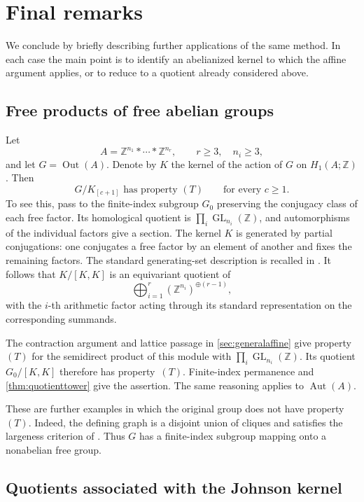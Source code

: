 \documentclass[11pt,a4paper]{article}
\theoremstyle{definition}
\newcommand{\Z}{\mathbb Z}
\newcommand{\GL}{\operatorname{GL}}
\newcommand{\Aut}{\operatorname{Aut}}
\newcommand{\rt}{(T)}
\begin{document}
\section{Final remarks}
\label{sec:finalremarks}

We conclude by briefly describing further applications of the same method.
In each case the main point is to identify an abelianized kernel
to which the affine argument applies, or to reduce to a quotient
already considered above.

\subsection{Free products of free abelian groups}

Let
\[
 A=\Z^{n_1}*\cdots *\Z^{n_r},\qquad r\ge3,\quad n_i\ge3,
\]
and let \(G=\operatorname{Out}(A)\). Denote by \(K\) the kernel
of the action of \(G\) on \(H_1(A;\Z)\). Then
\[
 G/K_{[c+1]}\text{ has property }\rt
 \qquad\text{for every }c\ge1.
\]
To see this, pass to the finite-index subgroup \(G_0\) preserving
the conjugacy class of each free factor. Its homological quotient
is \(\prod_i\GL_{n_i}(\Z)\), and automorphisms of the individual
factors give a section. The kernel \(K\) is generated by partial
conjugations: one conjugates a free factor by an element of another
and fixes the remaining factors. The standard generating-set
description is recalled in \cite[Section~2.5]{SaleRAAG}.
It follows that \(K/[K,K]\) is an equivariant quotient of
\[
 \bigoplus_{i=1}^r(\Z^{n_i})^{\oplus(r-1)},
\]
with the \(i\)-th arithmetic factor acting through its standard
representation on the corresponding summands.

The contraction argument and lattice passage in
\cref{sec:generalaffine} give property~\(\rt\) for the semidirect
product of this module with \(\prod_i\GL_{n_i}(\Z)\).
Its quotient \(G_0/[K,K]\) therefore has property~\(\rt\).
Finite-index permanence and \cref{thm:quotienttower} give the
assertion. The same reasoning applies to \(\Aut(A)\).

These are further examples in which the original group does not
have property~\(\rt\). Indeed, the defining graph is a disjoint
union of cliques and satisfies the largeness criterion of
\cite[Theorem~2(1b)]{GuirardelSale}. Thus \(G\) has a finite-index
subgroup mapping onto a nonabelian free group. 

\subsection{Quotients associated with the Johnson kernel}
\end{document}
